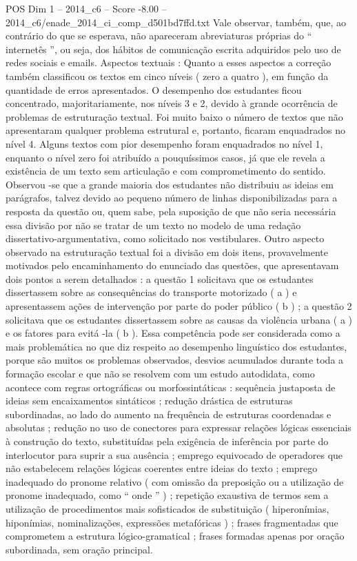 \begin{textsample}{POS Dim 1 – 2014\_c6 – Score -8.00 – 2014\_c6/enade\_2014\_ci\_comp\_d501bd7ffd.txt}
Vale observar, também, que, ao contrário do que se esperava, não apareceram abreviaturas próprias do “ internetês ”, ou seja, dos hábitos de comunicação escrita adquiridos pelo uso de redes sociais e emails.
Aspectos textuais : Quanto a esses aspectos a correção também classificou os textos em cinco níveis ( zero a quatro ), em função da quantidade de erros apresentados.
O desempenho dos estudantes ficou concentrado, majoritariamente, nos níveis 3 e 2, devido à grande ocorrência de problemas de estruturação textual.
Foi muito baixo o número de textos que não apresentaram qualquer problema estrutural e, portanto, ficaram enquadrados no nível 4.
Alguns textos com pior desempenho foram enquadrados no nível 1, enquanto o nível zero foi atribuído a pouquíssimos casos, já que ele revela a existência de um texto sem articulação e com comprometimento do sentido.
Observou -se que a grande maioria dos estudantes não distribuiu as ideias em parágrafos, talvez devido ao pequeno número de linhas disponibilizadas para a resposta da questão ou, quem sabe, pela suposição de que não seria necessária essa divisão por não se tratar de um texto no modelo de uma redação dissertativo-argumentativa, como solicitado nos vestibulares.
Outro aspecto observado na estruturação textual foi a divisão em dois itens, provavelmente motivados pelo encaminhamento do enunciado das questões, que apresentavam dois pontos a serem detalhados : a questão 1 solicitava que os estudantes dissertassem sobre as consequências do transporte motorizado ( a ) e apresentassem ações de intervenção por parte do poder público ( b ) ; a questão 2 solicitava que os estudantes dissertassem sobre as causas da violência urbana ( a ) e os fatores para evitá -la ( b ).
Essa competência pode ser considerada como a mais problemática no que diz respeito ao desempenho linguístico dos estudantes, porque são muitos os problemas observados, desvios acumulados durante toda a formação escolar e que não se resolvem com um estudo autodidata, como acontece com regras ortográficas ou morfossintáticas : sequência justaposta de ideias sem encaixamentos sintáticos ; redução drástica de estruturas subordinadas, ao lado do aumento na frequência de estruturas coordenadas e absolutas ; redução no uso de conectores para expressar relações lógicas essenciais à construção do texto, substituídas pela exigência de inferência por parte do interlocutor para suprir a sua ausência ; emprego equivocado de operadores que não estabelecem relações lógicas coerentes entre ideias do texto ; emprego inadequado do pronome relativo ( com omissão da preposição ou a utilização de pronome inadequado, como “ onde ” ) ; repetição exaustiva de termos sem a utilização de procedimentos mais sofisticados de substituição ( hiperonímias, hiponímias, nominalizações, expressões metafóricas ) ; frases fragmentadas que comprometem a estrutura lógico-gramatical ; frases formadas apenas por oração subordinada, sem oração principal.

\end{textsample}
